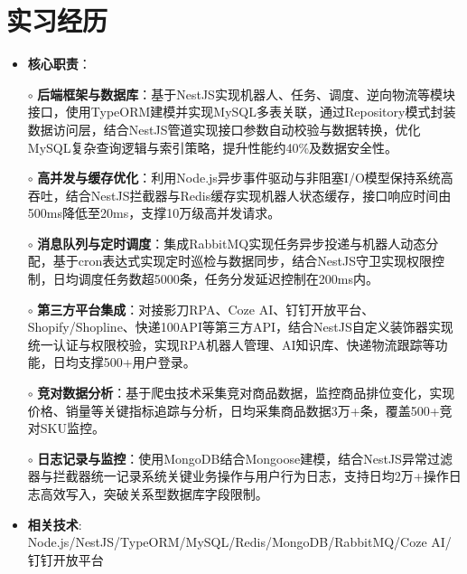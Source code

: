 \section{实习经历}
  \begin{normalsize}
    \begin{itemize}
    \item \textbf{核心职责}：
    \setlength{\itemindent}{1em} %
      \item[$\circ$] \textbf{后端框架与数据库}：基于NestJS实现机器人、任务、调度、逆向物流等模块接口，使用TypeORM建模并实现MySQL多表关联，通过Repository模式封装数据访问层，结合NestJS管道实现接口参数自动校验与数据转换，优化MySQL复杂查询逻辑与索引策略，提升性能约40\%及数据安全性。
      \item[$\circ$] \textbf{高并发与缓存优化}：利用Node.js异步事件驱动与非阻塞I/O模型保持系统高吞吐，结合NestJS拦截器与Redis缓存实现机器人状态缓存，接口响应时间由500ms降低至20ms，支撑10万级高并发请求。
      \item[$\circ$] \textbf{消息队列与定时调度}：集成RabbitMQ实现任务异步投递与机器人动态分配，基于cron表达式实现定时巡检与数据同步，结合NestJS守卫实现权限控制，日均调度任务数超5000条，任务分发延迟控制在200ms内。
      \item[$\circ$] \textbf{第三方平台集成}：对接影刀RPA、Coze AI、钉钉开放平台、Shopify/Shopline、快递100API等第三方API，结合NestJS自定义装饰器实现统一认证与权限校验，实现RPA机器人管理、AI知识库、快递物流跟踪等功能，日均支撑500+用户登录。
      \item[$\circ$] \textbf{竞对数据分析}：基于爬虫技术采集竞对商品数据，监控商品排位变化，实现价格、销量等关键指标追踪与分析，日均采集商品数据3万+条，覆盖500+竞对SKU监控。
      \item[$\circ$] \textbf{日志记录与监控}：使用MongoDB结合Mongoose建模，结合NestJS异常过滤器与拦截器统一记录系统关键业务操作与用户行为日志，支持日均2万+操作日志高效写入，突破关系型数据库字段限制。
    \setlength{\itemindent}{0em} %
    \item \textbf{相关技术}: Node.js/NestJS/TypeORM/MySQL/Redis/MongoDB/RabbitMQ/Coze AI/钉钉开放平台
    \end{itemize}
  \end{normalsize}
